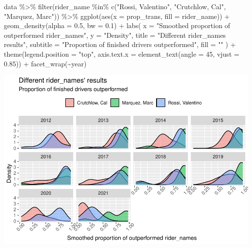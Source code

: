 \documentclass[
]{article}
\newenvironment{Shaded}{\begin{snugshade}}{\end{snugshade}}
\newcommand{\AttributeTok}[1]{\textcolor[rgb]{0.77,0.63,0.00}{#1}}
\newcommand{\DecValTok}[1]{\textcolor[rgb]{0.00,0.00,0.81}{#1}}
\newcommand{\FloatTok}[1]{\textcolor[rgb]{0.00,0.00,0.81}{#1}}
\newcommand{\FunctionTok}[1]{\textcolor[rgb]{0.00,0.00,0.00}{#1}}
\newcommand{\NormalTok}[1]{#1}
\newcommand{\SpecialCharTok}[1]{\textcolor[rgb]{0.00,0.00,0.00}{#1}}
\newcommand{\StringTok}[1]{\textcolor[rgb]{0.31,0.60,0.02}{#1}}
\begin{document}
\begin{Shaded}
\begin{Highlighting}[]
\NormalTok{data }\SpecialCharTok{\%\textgreater{}\%}
  \FunctionTok{filter}\NormalTok{(rider\_name }\SpecialCharTok{\%in\%} \FunctionTok{c}\NormalTok{(}\StringTok{"Rossi, Valentino"}\NormalTok{, }\StringTok{"Crutchlow, Cal"}\NormalTok{, }\StringTok{"Marquez, Marc"}\NormalTok{)) }\SpecialCharTok{\%\textgreater{}\%}
  \FunctionTok{ggplot}\NormalTok{(}\FunctionTok{aes}\NormalTok{(}\AttributeTok{x =}\NormalTok{ prop\_trans, }\AttributeTok{fill =}\NormalTok{ rider\_name)) }\SpecialCharTok{+}
  \FunctionTok{geom\_density}\NormalTok{(}\AttributeTok{alpha =} \FloatTok{0.5}\NormalTok{, }\AttributeTok{bw =} \FloatTok{0.1}\NormalTok{) }\SpecialCharTok{+}
  \FunctionTok{labs}\NormalTok{(}
    \AttributeTok{x =} \StringTok{"Smoothed proportion of outperformed rider\_names"}\NormalTok{,}
    \AttributeTok{y =} \StringTok{"Density"}\NormalTok{,}
    \AttributeTok{title =} \StringTok{"Different rider\_names\textquotesingle{} results"}\NormalTok{,}
    \AttributeTok{subtitle =} \StringTok{"Proportion of finished drivers outperformed"}\NormalTok{,}
    \AttributeTok{fill =} \StringTok{""}
\NormalTok{  ) }\SpecialCharTok{+}
  \FunctionTok{theme}\NormalTok{(}\AttributeTok{legend.position =} \StringTok{"top"}\NormalTok{, }\AttributeTok{axis.text.x =} \FunctionTok{element\_text}\NormalTok{(}\AttributeTok{angle =} \DecValTok{45}\NormalTok{, }\AttributeTok{vjust =} \FloatTok{0.85}\NormalTok{)) }\SpecialCharTok{+}
  \FunctionTok{facet\_wrap}\NormalTok{(}\SpecialCharTok{\textasciitilde{}}\NormalTok{year)}
\end{Highlighting}
\end{Shaded}

\includegraphics{Project_files/figure-latex/unnamed-chunk-6-1.pdf}
\end{document}
